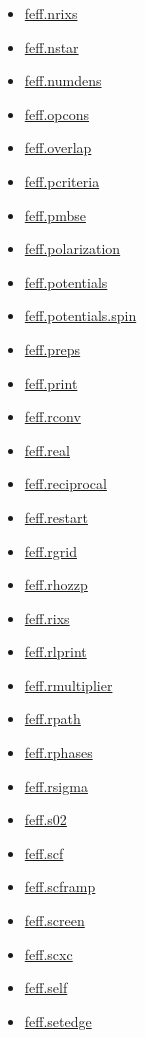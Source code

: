 \documentclass[11pt]{article}
\begin{document}
\begin{itemize}
\item \hyperref[kw:feff-nrixs]{feff.nrixs}
\item \hyperref[kw:feff-nstar]{feff.nstar}
\item \hyperref[kw:feff-numdens]{feff.numdens}
\item \hyperref[kw:feff-opcons]{feff.opcons}
\item \hyperref[kw:feff-overlap]{feff.overlap}
\item \hyperref[kw:feff-pcriteria]{feff.pcriteria}
\item \hyperref[kw:feff-pmbse]{feff.pmbse}
\item \hyperref[kw:feff-polarization]{feff.polarization}
\item \hyperref[kw:feff-potentials]{feff.potentials}
\item \hyperref[kw:feff-potentials-spin]{feff.potentials.spin}
\item \hyperref[kw:feff-preps]{feff.preps}
\item \hyperref[kw:feff-print]{feff.print}
\item \hyperref[kw:feff-rconv]{feff.rconv}
\item \hyperref[kw:feff-real]{feff.real}
\item \hyperref[kw:feff-reciprocal]{feff.reciprocal}
\item \hyperref[kw:feff-restart]{feff.restart}
\item \hyperref[kw:feff-rgrid]{feff.rgrid}
\item \hyperref[kw:feff-rhozzp]{feff.rhozzp}
\item \hyperref[kw:feff-rixs]{feff.rixs}
\item \hyperref[kw:feff-rlprint]{feff.rlprint}
\item \hyperref[kw:feff-rmultiplier]{feff.rmultiplier}
\item \hyperref[kw:feff-rpath]{feff.rpath}
\item \hyperref[kw:feff-rphases]{feff.rphases}
\item \hyperref[kw:feff-rsigma]{feff.rsigma}
\item \hyperref[kw:feff-s02]{feff.s02}
\item \hyperref[kw:feff-scf]{feff.scf}
\item \hyperref[kw:feff-scframp]{feff.scframp}
\item \hyperref[kw:feff-screen]{feff.screen}
\item \hyperref[kw:feff-scxc]{feff.scxc}
\item \hyperref[kw:feff-self]{feff.self}
\item \hyperref[kw:feff-setedge]{feff.setedge}

\end{itemize}
\end{document}
